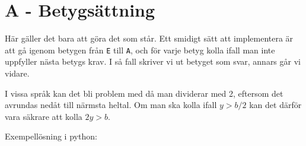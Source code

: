 \section*{A - Betygsättning}
Här gäller det bara att göra det som står.
Ett smidigt sätt att implementera är att gå igenom betygen från \texttt{E} till \texttt{A},
och för varje betyg kolla ifall man inte uppfyller nästa betygs krav.
I så fall skriver vi ut betyget som svar, annars går vi vidare.

I vissa språk kan det bli problem med då man dividerar med 2,
eftersom det avrundas nedåt till närmsta heltal.
Om man ska kolla ifall $y>b/2$ kan det därför vara säkrare att kolla $2y>b$.

Exempellösning i python:
